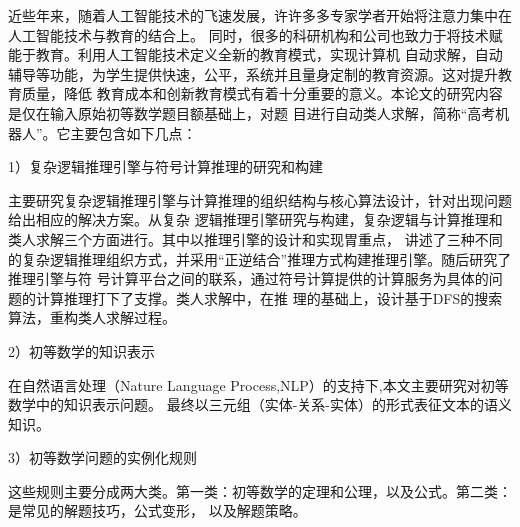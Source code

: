 \documentclass{standalone}
\begin{document}
	
\begin{chineseabstract}
近些年来，随着人工智能技术的飞速发展，许许多多专家学者开始将注意力集中在人工智能技术与教育的结合上。
同时，很多的科研机构和公司也致力于将技术赋能于教育。利用人工智能技术定义全新的教育模式，实现计算机
自动求解，自动辅导等功能，为学生提供快速，公平，系统并且量身定制的教育资源。这对提升教育质量，降低
教育成本和创新教育模式有着十分重要的意义。本论文的研究内容是仅在输入原始初等数学题目额基础上，对题
目进行自动类人求解，简称“高考机器人”。它主要包含如下几点：

1）复杂逻辑推理引擎与符号计算推理的研究和构建

主要研究复杂逻辑推理引擎与计算推理的组织结构与核心算法设计，针对出现问题给出相应的解决方案。从复杂
逻辑推理引擎研究与构建，复杂逻辑与计算推理和类人求解三个方面进行。其中以推理引擎的设计和实现胃重点，
讲述了三种不同的复杂逻辑推理组织方式，并采用“正逆结合”推理方式构建推理引擎。随后研究了推理引擎与符
号计算平台之间的联系，通过符号计算提供的计算服务为具体的问题的计算推理打下了支撑。类人求解中，在推
理的基础上，设计基于DFS的搜索算法，重构类人求解过程。

2）初等数学的知识表示

在自然语言处理（Nature Language Process,NLP）的支持下,本文主要研究对初等数学中的知识表示问题。
最终以三元组（实体-关系-实体）的形式表征文本的语义知识。

3）初等数学问题的实例化规则

这些规则主要分成两大类。第一类：初等数学的定理和公理，以及公式。第二类：是常见的解题技巧，公式变形，
以及解题策略。


\end{chineseabstract}
\end{document}
